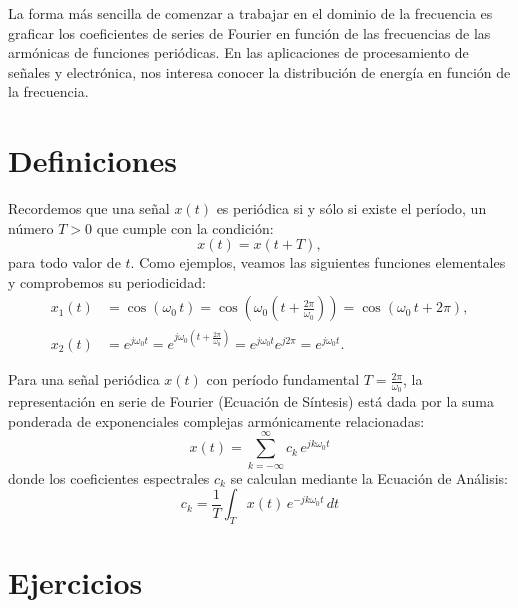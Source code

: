 \documentclass[11pt,a4paper,openany]{book}
\begin{document}
La forma más sencilla de comenzar a trabajar en el dominio de la frecuencia es graficar los coeficientes de series de Fourier en función de las frecuencias de las armónicas de funciones periódicas. En las aplicaciones de procesamiento de señales y electrónica, nos interesa conocer la distribución de energía en función de la frecuencia.

\section{Definiciones}

Recordemos que una señal $x(t)$ es periódica si y sólo si existe el período, un número $T > 0$ que cumple con la condición:
\begin{equation}
	x(t) = x(t+T),
\end{equation}
para todo valor de $t$. Como ejemplos, veamos las siguientes funciones elementales y comprobemos su periodicidad:
\begin{align}
	x_1(t) &= \cos(\omega_0 \, t) = \cos\left(\omega_0 \left(t + \frac{2\pi}{\omega_0}\right)\right) = \cos(\omega_0 \, t + 2\pi), \\
	x_2(t) &= e^{j \omega_0 t} = e^{j \omega_0 \left(t + \frac{2\pi}{\omega_0}\right)} = e^{j \omega_0 t} e^{j 2\pi} = e^{j \omega_0 t}.
\end{align}

Para una señal periódica $x(t)$ con período fundamental $T = \frac{2\pi}{\omega_0}$, la representación en serie de Fourier (Ecuación de Síntesis) está dada por la suma ponderada de exponenciales complejas armónicamente relacionadas:
\begin{equation}
	x(t) = \sum_{k=-\infty}^{\infty} c_k \, e^{j k \omega_0 t}
\end{equation}
donde los coeficientes espectrales $c_k$ se calculan mediante la Ecuación de Análisis:
\begin{equation}
	c_k = \frac{1}{T} \int_{T} x(t) \, e^{-j k \omega_0 t} \, dt
\end{equation}

\section{Ejercicios}

\end{document}
